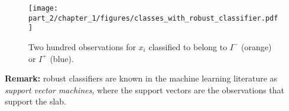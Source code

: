 \begin{figure}[H]
    \texttt{[image: part\_2/chapter\_1/figures/classes\_with\_robust\_classifier.pdf]}
    \caption{Two hundred observations for $x_i$ classified to belong to $I^-$ (orange) or $I^+$ (blue).}        
    \label{fig:observations_with_rob_classifier}
\end{figure}


{\bf Remark:} robust classifiers are known in the machine learning literature as \emph{support vector machines}, where the support vectors are the observations that support the slab. 
